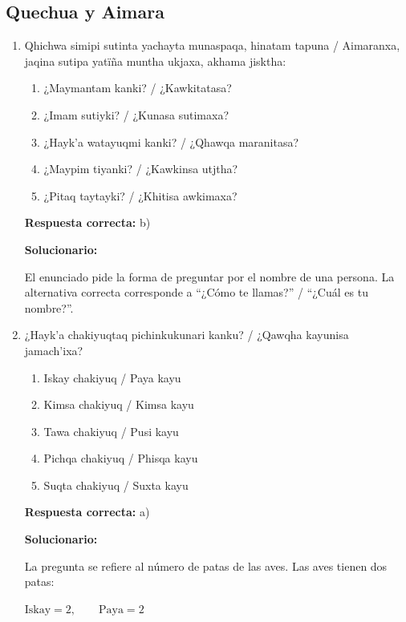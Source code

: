 \subsection*{Quechua y Aimara}

\begin{enumerate}[resume]
	
	\item Qhichwa simipi sutinta yachayta munaspaqa, hinatam tapuna / Aimaranxa, jaqina sutipa yatïña muntha ukjaxa, akhama jisktha:
	\begin{enumerate}[label=\alph*)]
		\item ¿Maymantam kanki? / ¿Kawkitatasa?
		\item ¿Imam sutiyki? / ¿Kunasa sutimaxa?
		\item ¿Hayk’a watayuqmi kanki? / ¿Qhawqa maranitasa?
		\item ¿Maypim tiyanki? / ¿Kawkinsa utjtha?
		\item ¿Pitaq taytayki? / ¿Khitisa awkimaxa?
	\end{enumerate}
	\textbf{Respuesta correcta:} b)
	
	\vspace{2mm}
	\textbf{Solucionario:}
	
	El enunciado pide la forma de preguntar por el nombre de una persona. La alternativa correcta corresponde a “¿Cómo te llamas?” / “¿Cuál es tu nombre?”.
	
	\vspace{6mm}
	
	\item ¿Hayk’a chakiyuqtaq pichinkukunari kanku? / ¿Qawqha kayunisa jamach’ixa?
	\begin{enumerate}[label=\alph*)]
		\item Iskay chakiyuq / Paya kayu
		\item Kimsa chakiyuq / Kimsa kayu
		\item Tawa chakiyuq / Pusi kayu
		\item Pichqa chakiyuq / Phisqa kayu
		\item Suqta chakiyuq / Suxta kayu
	\end{enumerate}
	\textbf{Respuesta correcta:} a)
	
	\vspace{2mm}
	\textbf{Solucionario:}
	
	La pregunta se refiere al número de patas de las aves. Las aves tienen dos patas:
	
	$\text{Iskay} = 2,\qquad \text{Paya} = 2$
	

	
	\vspace{6mm}
	
\end{enumerate}










